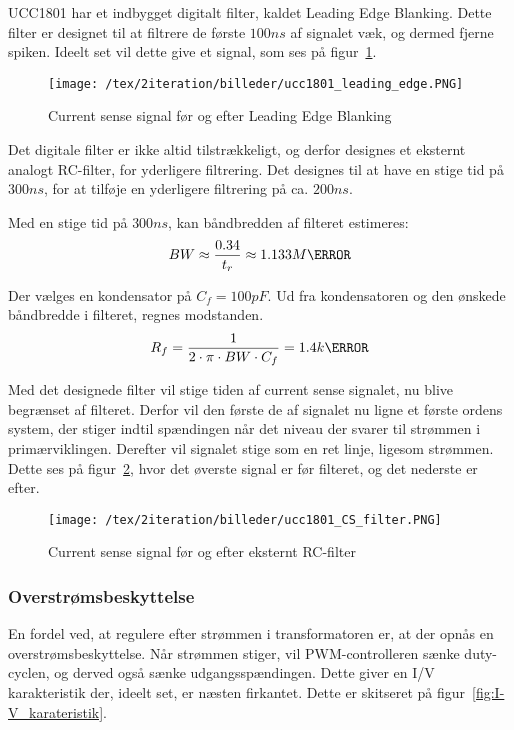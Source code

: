 UCC1801 har et indbygget digitalt filter, kaldet Leading Edge Blanking. Dette filter er designet til at filtrere de første $100ns$ af signalet væk, og dermed fjerne spiken. Ideelt set vil dette give et signal, som ses på figur~\ref{fig:ucc1801_leading_edge}.

\begin{figure}[H]
	\center
	\texttt{[image: /tex/2iteration/billeder/ucc1801\_leading\_edge.PNG]}
	\caption{Current sense signal før og efter Leading Edge Blanking}
	\label{fig:ucc1801_leading_edge}
\end{figure}

Det digitale filter er ikke altid tilstrækkeligt, og derfor designes et eksternt analogt RC-filter, for yderligere filtrering. Det designes til at have en stige tid på $300ns$, for at tilføje en yderligere filtrering på ca. $200ns$. 

Med en stige tid på $300ns$, kan båndbredden af filteret estimeres:
\begin{equation} \label{filter_BW}
BW \approx \frac{0.34}{t_r} \approx 1.133M\hertz
\end{equation}

\noindent Der vælges en kondensator på $C_f=100pF$. Ud fra kondensatoren og den ønskede båndbredde i filteret, regnes modstanden.
\begin{equation} \label{filter_R}
R_f = \frac{1}{2 \cdot \pi \cdot BW \cdot C_f} = 1.4k\ohm
\end{equation}

Med det designede filter vil stige tiden af current sense signalet, nu blive begrænset af filteret. Derfor vil den første de af signalet nu ligne et første ordens system, der stiger indtil spændingen når det niveau der svarer til strømmen i primærviklingen. Derefter vil signalet stige som en ret linje, ligesom strømmen. Dette ses på figur~\ref{fig:ucc1801_CS_filter}, hvor det øverste signal er før filteret, og det nederste er efter.

\begin{figure}[H]
	\center
	\texttt{[image: /tex/2iteration/billeder/ucc1801\_CS\_filter.PNG]}
	\caption{Current sense signal før og efter eksternt RC-filter}
	\label{fig:ucc1801_CS_filter}
\end{figure}

\subsubsection{Overstrømsbeskyttelse} \label{CS_protection}
En fordel ved, at regulere efter strømmen i transformatoren er, at der opnås en overstrømsbeskyttelse. Når strømmen stiger, vil PWM-controlleren sænke duty-cyclen, og derved også sænke udgangsspændingen. Dette giver en I/V karakteristik der, ideelt set, er næsten firkantet. Dette er skitseret på figur~\ref{fig:I-V_karateristik}. 

